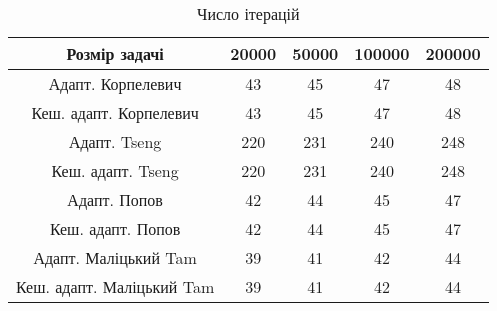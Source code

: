 \begin{table}[H]
	\centering
	\begin{tabular}{|c||c|c|c|c|}\hline
		Розмір задачі & 20000 & 50000 & 100000 & 200000 \\ \hline \hline
		Адапт. Корпелевич & 43 & 45 & 47 & 48 \\ \hline
		Кеш. адапт. Корпелевич & 43 & 45 & 47 & 48 \\ \hline
		Адапт. Tseng & 220 & 231 & 240 & 248 \\ \hline
		Кеш. адапт. Tseng & 220 & 231 & 240 & 248 \\ \hline
		Адапт. Попов & 42 & 44 & 45 & 47 \\ \hline
		Кеш. адапт. Попов & 42 & 44 & 45 & 47 \\ \hline
		Адапт. Маліцький Tam & 39 & 41 & 42 & 44 \\ \hline
		Кеш. адапт. Маліцький Tam & 39 & 41 & 42 & 44 \\ \hline
	\end{tabular}
	\caption{Число ітерацій}
\end{table}
